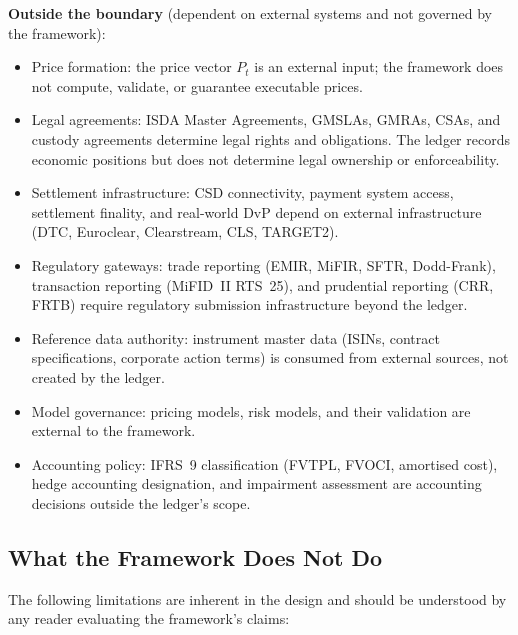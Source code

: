 \documentclass[11pt,a4paper]{article}
\begin{document}
\medskip
\noindent\textbf{Outside the boundary} (dependent on external systems and not governed by the framework):
\begin{itemize}[nosep]
\item Price formation: the price vector $P_t$ is an external input; the framework does not compute, validate, or guarantee executable prices.
\item Legal agreements: ISDA Master Agreements, GMSLAs, GMRAs, CSAs, and custody agreements determine legal rights and obligations. The ledger records economic positions but does not determine legal ownership or enforceability.
\item Settlement infrastructure: CSD connectivity, payment system access, settlement finality, and real-world DvP depend on external infrastructure (DTC, Euroclear, Clearstream, CLS, TARGET2).
\item Regulatory gateways: trade reporting (EMIR, MiFIR, SFTR, Dodd-Frank), transaction reporting (MiFID~II RTS~25), and prudential reporting (CRR, FRTB) require regulatory submission infrastructure beyond the ledger.
\item Reference data authority: instrument master data (ISINs, contract specifications, corporate action terms) is consumed from external sources, not created by the ledger.
\item Model governance: pricing models, risk models, and their validation are external to the framework.
\item Accounting policy: IFRS~9 classification (FVTPL, FVOCI, amortised cost), hedge accounting designation, and impairment assessment are accounting decisions outside the ledger's scope.
\end{itemize}

\subsection{What the Framework Does Not Do}

The following limitations are inherent in the design and should be understood by any reader evaluating the framework's claims:
\end{document}
